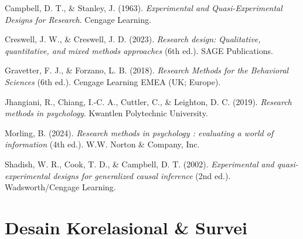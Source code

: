 \documentclass[
  indonesian,
  letterpaper,
  DIV=11,
  numbers=noendperiod]{scrreprt}
\newlength{\cslhangindent}
\newenvironment{CSLReferences}[2] %
 {\begin{list}{}{%
  \setlength{\itemindent}{0pt}
  \setlength{\leftmargin}{0pt}
  \setlength{\parsep}{0pt}
  \ifodd #1
   \setlength{\leftmargin}{\cslhangindent}
   \setlength{\itemindent}{-1\cslhangindent}
  \fi
  \setlength{\itemsep}{#2\baselineskip}}}
 {\end{list}}
\begin{document}
\label{refs--12}
\begin{CSLReferences}{1}{0}
Campbell, D. T., \& Stanley, J. (1963). \emph{Experimental and
Quasi-Experimental Designs for Research}. Cengage Learning.

Creswell, J. W., \& Creswell, J. D. (2023). \emph{Research design:
Qualitative, quantitative, and mixed methods approaches} (6th ed.). SAGE
Publications.

Gravetter, F. J., \& Forzano, L. B. (2018). \emph{Research Methods for
the Behavioral Sciences} (6th ed.). Cengage Learning EMEA (UK; Europe).

Jhangiani, R., Chiang, I.-C. A., Cuttler, C., \& Leighton, D. C. (2019).
\emph{Research methods in psychology}. Kwantlen Polytechnic University.

Morling, B. (2024). \emph{Research methods in psychology : evaluating a
world of information} (4th ed.). W.W. Norton \& Company, Inc.

Shadish, W. R., Cook, T. D., \& Campbell, D. T. (2002).
\emph{Experimental and quasi-experimental designs for generalized causal
inference} (2nd ed.). Wadsworth/Cengage Learning.

\end{CSLReferences}

\chapter{Desain Korelasional \&
Survei}\label{desain-korelasional-survei}
\end{document}
